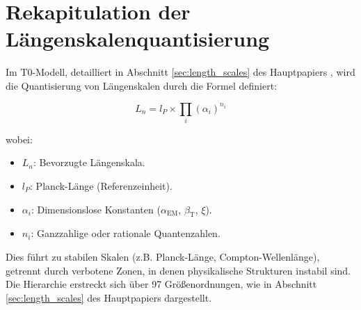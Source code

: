 \documentclass[12pt,a4paper]{article}
\newcommand{\alphaEM}{\alpha_{\text{EM}}}
\newcommand{\betaT}{\beta_{\text{T}}}
\begin{document}
	\section{Rekapitulation der Längenskalenquantisierung}
	\label{sec:length_scales_recap}
	
	Im T0-Modell, detailliert in Abschnitt \ref{sec:length_scales} des Hauptpapiers \cite{pascher_alphabeta_2025}, wird die Quantisierung von Längenskalen durch die Formel definiert:
	
	\begin{equation}
		L_n = l_P \times \prod_{i} (\alpha_i)^{n_i}
	\end{equation}
	
	wobei:
	\begin{itemize}
		\item $L_n$: Bevorzugte Längenskala.
		\item $l_P$: Planck-Länge (Referenzeinheit).
		\item $\alpha_i$: Dimensionslose Konstanten (\(\alphaEM\), \(\betaT\), \(\xi\)).
		\item $n_i$: Ganzzahlige oder rationale Quantenzahlen.
	\end{itemize}
	
	Dies führt zu stabilen Skalen (z.B. Planck-Länge, Compton-Wellenlänge), getrennt durch verbotene Zonen, in denen physikalische Strukturen instabil sind. Die Hierarchie erstreckt sich über 97 Größenordnungen, wie in Abschnitt \ref{sec:length_scales} des Hauptpapiers dargestellt.
	
\end{document}
